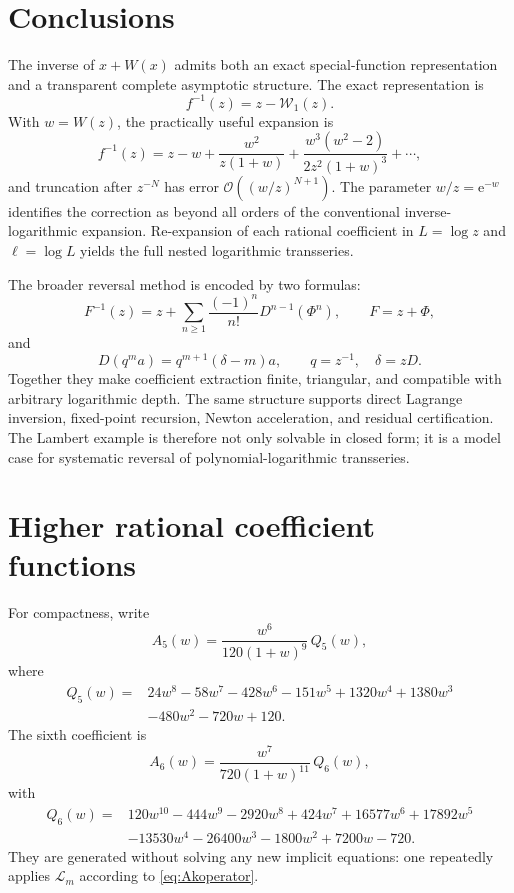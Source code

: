\documentclass[11pt]{article}
\theoremstyle{clean}
\newcommand{\rLambert}{\mathcal W}
\newcommand{\e}{\mathrm e}
\newcommand{\bigO}{\mathcal O}
\begin{document}
\section{Conclusions}

The inverse of \(x+W(x)\) admits both an exact special-function representation
and a transparent complete asymptotic structure.  The exact representation is
\[
  f^{-1}(z)=z-\rLambert_1(z).
\]
With \(w=W(z)\), the practically useful expansion is
\[
  f^{-1}(z)=z-w+\frac{w^2}{z(1+w)}
  +\frac{w^3(w^2-2)}{2z^2(1+w)^3}+\cdots,
\]
and truncation after \(z^{-N}\) has error
\(\bigO((w/z)^{N+1})\).  The parameter \(w/z=\e^{-w}\) identifies the
correction as beyond all orders of the conventional inverse-logarithmic
expansion.  Re-expansion of each rational coefficient in
\(L=\log z\) and \(\ell=\log L\) yields the full nested logarithmic
transseries.

The broader reversal method is encoded by two formulas:
\[
  F^{-1}(z)=z+
  \sum_{n\ge1}\frac{(-1)^n}{n!}D^{n-1}(\Phi^n),
  \qquad F=z+\Phi,
\]
and
\[
  D(q^m a)=q^{m+1}(\delta-m)a,
  \qquad q=z^{-1},\quad \delta=zD.
\]
Together they make coefficient extraction finite, triangular, and compatible
with arbitrary logarithmic depth.  The same structure supports direct
Lagrange inversion, fixed-point recursion, Newton acceleration, and residual
certification.  The Lambert example is therefore not only solvable in closed
form; it is a model case for systematic reversal of polynomial-logarithmic
transseries.

\appendix

\section{Higher rational coefficient functions}\label{app:higherA}

For compactness, write
\begin{equation}\label{eq:A5}
 A_5(w)=\frac{w^6}{120(1+w)^9}\,Q_5(w),
\end{equation}
where
\begin{align*}
 Q_5(w)={}&24w^8-58w^7-428w^6-151w^5
 +1320w^4+1380w^3\\
 &-480w^2-720w+120.
\end{align*}
The sixth coefficient is
\begin{equation}\label{eq:A6}
 A_6(w)=\frac{w^7}{720(1+w)^{11}}\,Q_6(w),
\end{equation}
with
\begin{align*}
 Q_6(w)={}&120w^{10}-444w^9-2920w^8+424w^7
 +16577w^6+17892w^5\\
 &-13530w^4-26400w^3-1800w^2+7200w-720.
\end{align*}
They are generated without solving any new implicit equations: one repeatedly
applies \(\mathcal L_m\) according to \cref{eq:Akoperator}.
\end{document}
